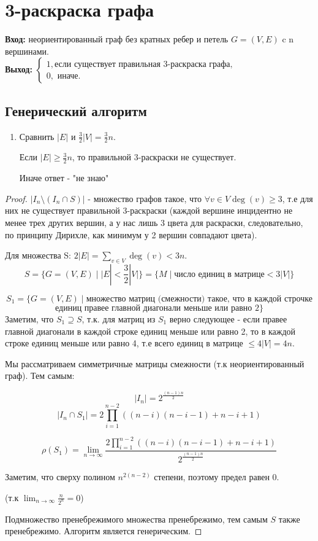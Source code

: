 \documentclass[a4paper, 12pt]{article}
\theoremstyle{definition}
\theoremstyle{remark}
\DeclareMathOperator{\degg}{deg}
\begin{document}
\section*{3-раскраска графа}
\textbf{Вход:} неориентированный граф без кратных ребер и петель $G = (V, E)$ c n вершинами.
\\
\textbf{Выход:} $\begin{cases}
    1,\text{если существует правильная 3-раскраска графа,}\\
    0,\text{ иначе.}
\end{cases}$
\subsection*{Генерический алгоритм}
\begin{enumerate}
    \item Сравнить $|E|$ и $\frac32|V|=\frac32 n$.

    Если $|E| \ge \frac32 n$, то правильной 3-раскраски не существует.
    
    Иначе ответ - "не знаю"
\end{enumerate}
\begin{proof}
    $|I_n \setminus (I_n\cap S)|$ - множество графов такое, что $\forall v\in V \degg(v) \ge 3$, т.е для них не существует правильной 3-раскраски
    (каждой вершине инцидентно не менее трех других вершин, а у нас лишь 3 цвета для раскраски, следовательно, по принципу Дирихле,
    как минимум у 2 вершин совпадают цвета).

    Для множества S: $2|E| = \sum_{v\in V} \degg (v) < 3n$.
    \[S = \{G = (V, E) \;|\; |E| <\frac32 |V|\} = \{M \;|\; \text{число единиц в матрице} < 3|V|\}\]

    \[S_1 = \{G = (V, E) \;|\; \text{множество матриц (смежности) такое, что в каждой строчке}\]
    \[\text{единиц правее главной диагонали меньше или равно 2}\}\]
    Заметим, что $S_1 \supseteq S$, т.к. для матриц из $S_1$ верно следующее - если правее главной диагонали в каждой строке единиц меньше или равно 2, то в каждой строке единиц меньше или равно 4, т.е всего единиц в матрице $\le 4 |V| = 4n$.

    Мы рассматриваем симметричные матрицы смежности (т.к неориентированный граф). Тем самым:
    
    \[|I_n| = 2^{\frac{(n-1)n}{2}}\]
    \[|I_n\cap S_1| = 2\prod_{i=1}^{n-2} ((n-i)(n-i-1) + n - i +1)\]

    \[ \rho (S_1) = \lim_{n\to \infty} \frac{2\prod_{i=1}^{n-2}((n-i)(n-i-1) + n - i +1)}{2^{\frac{(n-1)n}{2}}}\]

    Заметим, что сверху полином $n^{2(n-2)}$ степени, поэтому предел равен 0.

    (т.к $\lim_{n\to \infty}\frac{n}{2^n} = 0$)

    Подмножество пренебрежимого множества пренебрежимо, тем самым $S$ также пренебрежимо. Алгоритм является генерическим.
\end{proof}
\end{document}
